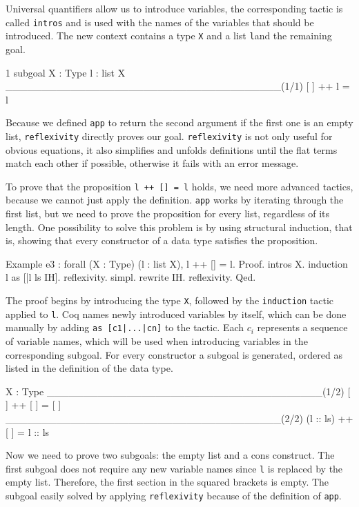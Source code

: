 \documentclass[paper = a4, fleqn, abstract=on, twoside]{scrreprt}
\newcommand{\coqinline}[1]{\texttt{#1}}
\begin{document}
Universal quantifiers allow us to introduce variables, the corresponding tactic is called \coqinline{intros} and is used with the names of the variables that should be introduced. The new context contains a type \coqinline{X} and a list \coqinline{l}and the remaining goal.
\begin{coqcode}
1 subgoal
X : Type
l : list X
______________________________________(1/1)
[ ] ++ l = l
\end{coqcode}
Because we defined \coqinline{app} to return the second argument if the first one is an empty list, \coqinline{reflexivity} directly proves our goal. \coqinline{reflexivity} is not only useful for obvious equations, it also simplifies and unfolds definitions until the flat terms match each other if possible, otherwise it fails with an error message.
\par
To prove that the proposition \coqinline{l ++ [] = l} holds, we need more advanced tactics, because we cannot just apply the definition. \coqinline{app} works by iterating through the first list, but we need to prove the proposition for every list, regardless of its length. One possibility to solve this problem is by using structural induction, that is, showing that every constructor of a data type satisfies the proposition.
\newpage
\begin{coqcode}
Example e3 : forall (X : Type) (l : list X), l ++ [] = l.
Proof. intros X. induction l as [|l ls IH].
  reflexivity.
  simpl. rewrite IH. reflexivity.
Qed.
\end{coqcode}
The proof begins by introducing the type \coqinline{X}, followed by the \coqinline{induction} tactic applied to \coqinline{l}. Coq names newly introduced variables by itself, which can be done manually by adding \coqinline{as [c1|...|cn]} to the tactic. Each $c_{i}$ represents a sequence of variable names, which will be used when introducing variables in the corresponding subgoal. For every constructor a subgoal is generated, ordered as listed in the definition of the data type.
\begin{coqcode}
X : Type
______________________________________(1/2)
[ ] ++ [ ] = [ ]
______________________________________(2/2)
(l :: ls) ++ [ ] = l :: ls
\end{coqcode}
Now we need to prove two subgoals: the empty list and a cons construct. The first subgoal does not require any new variable names since \coqinline{l} is replaced by the empty list. Therefore, the first section in the squared brackets is empty. The subgoal easily solved by applying \coqinline{reflexivity} because of the definition of \coqinline{app}.
\end{document}
